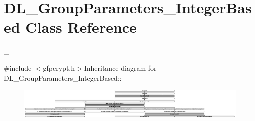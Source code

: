 \hypertarget{class_d_l___group_parameters___integer_based}{
\section{DL\_\-GroupParameters\_\-IntegerBased Class Reference}
\label{class_d_l___group_parameters___integer_based}
}


\_\-  


{\ttfamily \#include $<$gfpcrypt.h$>$}Inheritance diagram for DL\_\-GroupParameters\_\-IntegerBased::\begin{figure}[H]
\begin{center}
\leavevmode
\includegraphics[height=1.47228cm]{class_d_l___group_parameters___integer_based}
\end{center}
\end{figure}
